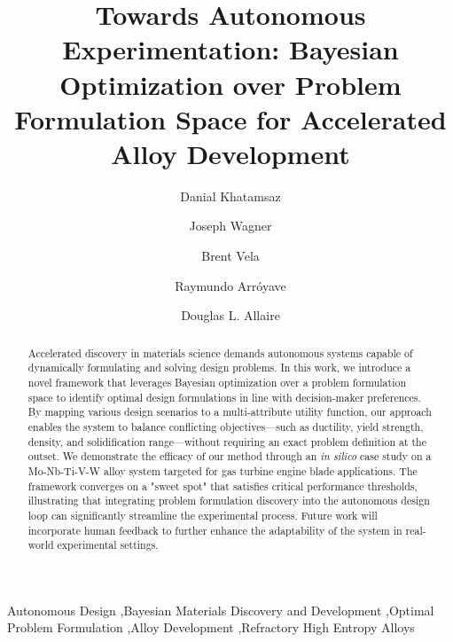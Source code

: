 \documentclass[final,5p,times,twocolumn]{elsarticle}
\begin{document}
\begin{frontmatter}

\title{Towards Autonomous Experimentation: Bayesian Optimization over Problem Formulation Space for Accelerated Alloy Development}

\author[1]{Danial Khatamsaz}
\author[2]{Joseph Wagner}
\author[1]{Brent Vela}
\author[1,2,3]{Raymundo Arr\'oyave}
\author[2,cor1]{Douglas L. Allaire}


\address[1]{Department of Materials Science and Engineering, Texas A\&M University, College Station, TX 77843, USA}
\address[2]{J. Mike Walker '66 Department of Mechanical Engineering, Texas A\&M University, College Station, TX 77843, USA}
\address[3]{Wm Michael Barnes '64 Department of Industrial and Systems Engineering, Texas A\&M University, College Station, TX 77843, USA}

\begin{abstract}
Accelerated discovery in materials science demands autonomous systems capable of dynamically formulating and solving design problems. In this work, we introduce a novel framework that leverages Bayesian optimization over a problem formulation space to identify optimal design formulations in line with decision-maker preferences. By mapping various design scenarios to a multi-attribute utility function, our approach enables the system to balance conflicting objectives—such as ductility, yield strength, density, and solidification range—without requiring an exact problem definition at the outset. We demonstrate the efficacy of our method through an \emph{in silico} case study on a Mo-Nb-Ti-V-W alloy system targeted for gas turbine engine blade applications. The framework converges on a "sweet spot" that satisfies critical performance thresholds, illustrating that integrating problem formulation discovery into the autonomous design loop can significantly streamline the experimental process. Future work will incorporate human feedback to further enhance the adaptability of the system in real-world experimental settings.

\end{abstract}

\begin{keyword}
Autonomous Design \sep Bayesian Materials Discovery and Development \sep Optimal Problem Formulation \sep Alloy Development \sep Refractory High Entropy Alloys
\end{keyword}

\end{frontmatter}
\end{document}
